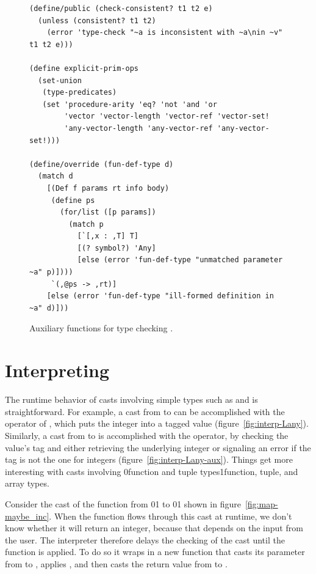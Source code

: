 \documentclass[7x10]{TimesAPriori_MIT}%
\def\racketEd{0}
\def\pythonEd{1}
\def\edition{1}
\newcommand{\racket}[1]{{\if\edition\racketEd{#1}\fi}}
\newcommand{\pythonColor}[0]{}
\newcommand{\python}[1]{{\if\edition\pythonEd\pythonColor #1\fi}}
\numberwithin{theorem}{chapter}
\numberwithin{definition}{chapter}
\numberwithin{equation}{chapter}
\begin{document}
{\begin{figure}[tbp]
\begin{tcolorbox}[colback=white]
\begin{lstlisting}
(define/public (check-consistent? t1 t2 e)
  (unless (consistent? t1 t2)
    (error 'type-check "~a is inconsistent with ~a\nin ~v" t1 t2 e)))

(define explicit-prim-ops
  (set-union
   (type-predicates)
   (set 'procedure-arity 'eq? 'not 'and 'or
        'vector 'vector-length 'vector-ref 'vector-set!
        'any-vector-length 'any-vector-ref 'any-vector-set!)))

(define/override (fun-def-type d)
  (match d
    [(Def f params rt info body)
     (define ps
       (for/list ([p params])
         (match p
           [`[,x : ,T] T]
           [(? symbol?) 'Any]
           [else (error 'fun-def-type "unmatched parameter ~a" p)])))
     `(,@ps -> ,rt)]
    [else (error 'fun-def-type "ill-formed definition in ~a" d)]))
\end{lstlisting}
\end{tcolorbox}

\caption{Auxiliary functions for type checking \LangGrad{}.}
\label{fig:type-check-Lgradual-aux}
\end{figure}

\fi}



\section{Interpreting \LangCast{} }
\label{sec:interp-casts}

The runtime behavior of casts involving simple types such as
\INTTY{} and \BOOLTY{} is straightforward.  For example, a
cast from \INTTY{} to \CANYTY{} can be accomplished with the
 operator of \LangAny{}, which puts the integer into a
tagged value (figure~\ref{fig:interp-Lany}). Similarly, a cast from
\CANYTY{} to \INTTY{} is accomplished with the 
operator, by checking the value's tag and either retrieving
the underlying integer or signaling an error if the tag is not the
one for integers (figure~\ref{fig:interp-Lany-aux}).
%
Things get more interesting with casts involving
\racket{function and tuple types}\python{function, tuple, and array types}.

Consider the cast of the function  from
\racket{}\python{}
to
\racket{}\python{}
shown in figure~\ref{fig:map-maybe_inc}.
When the  function flows through
this cast at runtime, we don't know whether it will return
an integer, because that depends on the input from the user.
The \LangCast{} interpreter therefore delays the checking
of the cast until the function is applied. To do so it
wraps  in a new function that casts its parameter
from \INTTY{} to \CANYTY{}, applies , and then
casts the return value from \CANYTY{} to \INTTY{}.
\end{document}
